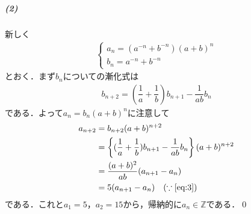 \documentclass[../../main.tex]{subfiles}
\begin{document}
\subparagraph{(2)}

新しく
\begin{align}
  \begin{cases}
    a_n=(a^{-n}+b^{-n})(a+b)^n \\
    b_n=a^{-n}+b^{-n}
  \end{cases}
\end{align}
とおく．まず$b_n$についての漸化式は
\begin{align}
  b_{n+2}=\left(\dfrac{1}{a}+\dfrac{1}{b}\right)b_{n+1}-\dfrac{1}{ab}b_n
\end{align}
である．よって$a_n=b_n(a+b)^n$に注意して
\begin{align}
  a_{n+2}
  &=b_{n+2}(a+b)^{n+2} \\
  &=\left\{(\dfrac{1}{a}+\dfrac{1}{b})b_{n+1}-\dfrac{1}{ab}b_n\right\}(a+b)^{n+2} \\
  &=\dfrac{(a+b)^2}{ab}(a_{n+1}-a_n) \\
  &=5(a_{n+1}-a_n) \quad (\because\text{\cref{eq:3}})
\end{align}
である．これと$a_1=5$，$a_2=15$から，帰納的に$a_n\in\mathbb{Z}$である．\qed
\newpage
\end{document}
